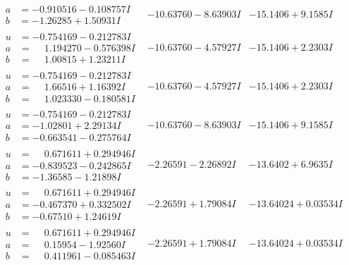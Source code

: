 \documentclass[1p]{elsarticle_modified}
\theoremstyle{definition}
\begin{document}
$$\begin{array}{c|c|c}
\begin{aligned}
a &= -0.910516 - 0.108757 I \\
b &= -1.26285 + 1.50931 I\end{aligned}
 & -10.63760 - 8.63903 I & -15.1406 + 9.1585 I \\ \hline\begin{aligned}
u &= -0.754169 - 0.212783 I \\
a &= \phantom{-}1.194270 - 0.576398 I \\
b &= \phantom{-}1.00815 + 1.23211 I\end{aligned}
 & -10.63760 - 4.57927 I & -15.1406 + 2.2303 I \\ \hline\begin{aligned}
u &= -0.754169 - 0.212783 I \\
a &= \phantom{-}1.66516 + 1.16392 I \\
b &= \phantom{-}1.023330 - 0.180581 I\end{aligned}
 & -10.63760 - 4.57927 I & -15.1406 + 2.2303 I \\ \hline\begin{aligned}
u &= -0.754169 - 0.212783 I \\
a &= -1.02801 + 2.29134 I \\
b &= -0.663541 - 0.275764 I\end{aligned}
 & -10.63760 - 8.63903 I & -15.1406 + 9.1585 I \\ \hline\begin{aligned}
u &= \phantom{-}0.671611 + 0.294946 I \\
a &= -0.839523 - 0.242865 I \\
b &= -1.36585 - 1.21898 I\end{aligned}
 & -2.26591 - 2.26892 I & -13.6402 + 6.9635 I \\ \hline\begin{aligned}
u &= \phantom{-}0.671611 + 0.294946 I \\
a &= -0.467370 + 0.332502 I \\
b &= -0.67510 + 1.24619 I\end{aligned}
 & -2.26591 + 1.79084 I & -13.64024 + 0.03534 I \\ \hline\begin{aligned}
u &= \phantom{-}0.671611 + 0.294946 I \\
a &= \phantom{-}0.15954 - 1.92560 I \\
b &= \phantom{-}0.411961 - 0.085463 I\end{aligned}
 & -2.26591 + 1.79084 I & -13.64024 + 0.03534 I \\ \hline\begin{aligned}

\end{aligned}
\end{array}$$
\end{document}
